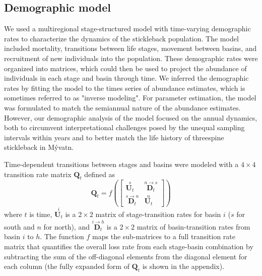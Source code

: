 
\subsection*{Demographic model}

We used a multiregional stage-structured model with time-varying demographic rates
to characterize the dynamics of the stickleback population. 
The model included mortality, transitions between life stages, movement between basins,
and recruitment of new individuals into the population. 
These demographic rates were organized into matrices,
which could then be used to project the abundance of individuals in each 
stage and basin through time.
We inferred the demographic rates by  
fitting the model to the times series of abundance estimates,
which is sometimes referred to as "inverse modeling". 
For parameter estimation, 
the model was formulated to match the semiannual nature of the abundance estimates.
However, our demographic analysis of the model focused on the annual dynamics, 
both to circumvent interpretational challenges 
posed by the unequal sampling intervals within years
and to better match the life history of threespine stickleback in M\'{y}vatn.

Time-dependent transitions between stages and basins 
were modeled with a $4\times{4}$ transition rate matrix $\mathbf{Q}_t$ defined as
%
\begin{equation} \label{eq:Q}
\mathbf{Q}_t = 
f\left(
\left[
\begin{array}{c|ccc}
    \overset{s}{\mathbf{U}_t} & \overset{n\rightarrow s}{\mathbf{D}_t} \\
    \hline
    \overset{s\rightarrow n}{\mathbf{D}_t} & \overset{n}{\mathbf{U}_t} 
    \end{array}
\right]
\right)
\end{equation}
%
where $t$ is time, 
$\overset{i}{\mathbf{U}_t}$ is a $2\times{2}$ matrix of stage-transition rates
for basin $i$ ($s$ for south and $n$ for north), and
$\overset{i\rightarrow h}{\mathbf{D}_t}$ is a $2\times{2}$ matrix 
of basin-transition rates from basin $i$ to $h$.
The function $f$ maps the sub-matrices to a full transition rate matrix that 
quantifies the overall loss rate from each stage-basin combination by 
subtracting the sum of the off-diagonal elements from the diagonal element 
for each column (the fully expanded form of $\mathbf{Q}_t$ is shown in the appendix).

